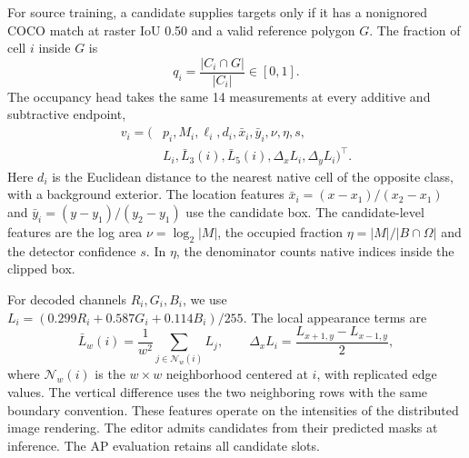 \documentclass[journal]{IEEEtran}
\begin{document}
For source training, a candidate supplies targets only if it has a nonignored COCO match at raster IoU 0.50 and a valid reference polygon \(G\). The fraction of cell \(i\) inside \(G\) is
\begin{equation}
 q_i=\frac{|C_i\cap G|}{|C_i|}\in[0,1].
 \label{eq:fractional-target}
\end{equation}
The occupancy head takes the same 14 measurements at every additive and subtractive endpoint,
\begin{equation}
\begin{aligned}
 v_i=\bigl(&p_i,M_i,\ell_i,d_i,\bar x_i,\bar y_i,\nu,\eta,s,\\
           &L_i,\bar L_{3}(i),\bar L_{5}(i),\Delta_x L_i,\Delta_y L_i\bigr)^{\!\top}.
\end{aligned}
\label{eq:endpoint-features}
\end{equation}
Here \(d_i\) is the Euclidean distance to the nearest native cell of the opposite class, with a background exterior. The location features \(\bar x_i=(x-x_1)/(x_2-x_1)\) and \(\bar y_i=(y-y_1)/(y_2-y_1)\) use the candidate box. The candidate-level features are the log area \(\nu=\log_2|M|\), the occupied fraction \(\eta=|M|/|B\cap\Omega|\) and the detector confidence \(s\). In \(\eta\), the denominator counts native indices inside the clipped box.

For decoded channels \(R_i,G_i,B_i\), we use \(L_i=(0.299R_i+0.587G_i+0.114B_i)/255\). The local appearance terms are
\begin{equation}
 \bar L_w(i)=\frac{1}{w^2}\sum_{j\in\mathcal N_w(i)}L_j,\qquad
 \Delta_x L_i=\frac{L_{x+1,y}-L_{x-1,y}}{2},
 \label{eq:appearance-features}
\end{equation}
where \(\mathcal N_w(i)\) is the \(w\times w\) neighborhood centered at \(i\), with replicated edge values. The vertical difference uses the two neighboring rows with the same boundary convention. These features operate on the intensities of the distributed image rendering. The editor admits candidates from their predicted masks at inference. The AP evaluation retains all candidate slots.
\end{document}
